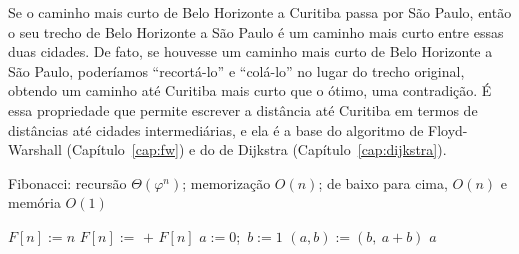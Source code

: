 \begin{exemplo}
Se o caminho mais curto de Belo Horizonte a Curitiba passa por São Paulo, então o seu trecho de Belo Horizonte a São Paulo é um caminho mais curto entre essas duas cidades. De fato, se houvesse um caminho mais curto de Belo Horizonte a São Paulo, poderíamos ``recortá-lo'' e ``colá-lo'' no lugar do trecho original, obtendo um caminho até Curitiba mais curto que o ótimo, uma contradição. É essa propriedade que permite escrever a distância até Curitiba em termos de distâncias até cidades intermediárias, e ela é a base do algoritmo de Floyd-Warshall (Capítulo~\ref{cap:fw}) e do de Dijkstra (Capítulo~\ref{cap:dijkstra}).
\end{exemplo}

\begin{pseudo}{Fibonacci: recursão $\Theta(\varphi^n)$; memorização $O(n)$; de baixo para cima, $O(n)$ e memória $O(1)$}
\begin{algorithmic}
 
     \State $F[n]:=n$ \Else \State $F[n]:=$  $+$  \EndIf
  \EndIf
  \State \Return $F[n]$
\EndFunction
{}
  \State $a:=0$;\ $b:=1$ 
   \State $(a,b):=(b,\ a+b)$ \EndFor
  \State \Return $a$
\EndFunction
\end{algorithmic}
\end{pseudo}

\begin{figura}
\qquad
{}
\end{figura}

